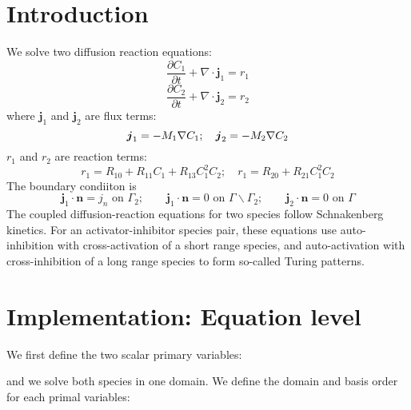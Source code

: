 \hypertarget{growth_Introduction}{}\section{Introduction}\label{growth_Introduction}
We solve two diffusion reaction equations\+: \[ \frac{\partial C_\text{1}}{\partial t}+\nabla\cdot\boldsymbol{j}_1=r_1 \] \[ \frac{\partial C_\text{2}}{\partial t}+\nabla\cdot\boldsymbol{j}_2=r_2 \] where $\boldsymbol{j}_1 $ and $\boldsymbol{j}_2 $ are flux terms\+: \[ \boldsymbol{j}_1=-M_1\nabla C_\text{1}; \quad \boldsymbol{j}_2=-M_2\nabla C_\text{2}\\ \] $r_1$ and $r_2$ are reaction terms\+: \[ r_1= R_{10}+R_{11}C_1+R_{13}C_1^2C_2; \quad r_1= R_{20}+R_{21}C_1^2C_2 \] The boundary condiiton is \[ \boldsymbol{j}_1\cdot\boldsymbol{n}=j_n \text{ on }\Gamma_2;\quad \quad \boldsymbol{j}_1\cdot\boldsymbol{n}=0 \text{ on }\Gamma \backslash \Gamma_2; \quad \quad \boldsymbol{j}_2\cdot\boldsymbol{n}=0 \text{ on }\Gamma \] The coupled diffusion-\/reaction equations for two species follow Schnakenberg kinetics. For an activator-\/inhibitor species pair, these equations use auto-\/inhibition with cross-\/activation of a short range species, and auto-\/activation with cross-\/inhibition of a long range species to form so-\/called Turing patterns.\hypertarget{growth_imple}{}\section{Implementation\+: Equation level}\label{growth_imple}
We first define the two scalar primary variables\+: 
\begin{DoxyCode}{0}
\end{DoxyCode}
 and we solve both species in one domain. We define the domain and basis order for each primal variables\+: 
\begin{DoxyCode}{0}
\end{DoxyCode}

